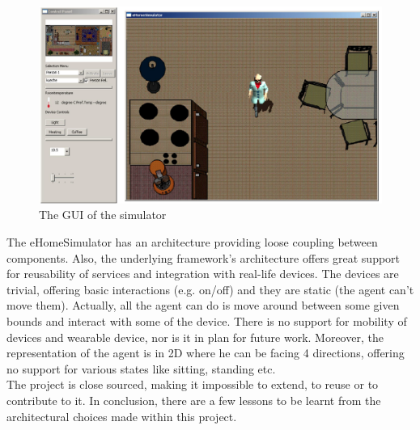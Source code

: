 \begin{figure}[H]
	\centering
	\includegraphics[width=\linewidth]{gfx/Chapter2/simulated_env}
	\caption{The GUI of the simulator}
	\label{fig:simulated_env}
\end{figure}

The eHomeSimulator has an architecture providing loose coupling between components. Also, the underlying framework's architecture offers great support for reusability of services and integration with real-life devices. The devices are trivial, offering basic interactions (e.g. on/off) and they are static (the agent can't move them). Actually, all the agent can do is move around between some given bounds and interact with some of the device. There is no support for mobility of devices and wearable device, nor is it in plan for future work. Moreover, the representation of the agent is in 2D where he can be facing 4 directions, offering no support for various states like sitting, standing etc.\\

The project is close sourced, making it impossible to extend, to reuse or to contribute to it. In conclusion, there are a few lessons to be learnt from the architectural choices made within this project.

